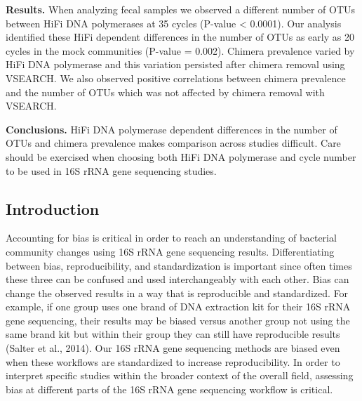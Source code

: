 \documentclass[12pt,]{article}
\begin{document}
\textbf{Results.} When analyzing fecal samples we observed a different
number of OTUs between HiFi DNA polymerases at 35 cycles (P-value
\textless{} 0.0001). Our analysis identified these HiFi dependent
differences in the number of OTUs as early as 20 cycles in the mock
communities (P-value = 0.002). Chimera prevalence varied by HiFi DNA
polymerase and this variation persisted after chimera removal using
VSEARCH. We also observed positive correlations between chimera
prevalence and the number of OTUs which was not affected by chimera
removal with VSEARCH.

\textbf{Conclusions.} HiFi DNA polymerase dependent differences in the
number of OTUs and chimera prevalence makes comparison across studies
difficult. Care should be exercised when choosing both HiFi DNA
polymerase and cycle number to be used in 16S rRNA gene sequencing
studies.

\newpage

\subsection{Introduction}\label{introduction}

Accounting for bias is critical in order to reach an understanding of
bacterial community changes using 16S rRNA gene sequencing results.
Differentiating between bias, reproducibility, and standardization is
important since often times these three can be confused and used
interchangeably with each other. Bias can change the observed results in
a way that is reproducible and standardized. For example, if one group
uses one brand of DNA extraction kit for their 16S rRNA gene sequencing,
their results may be biased versus another group not using the same
brand kit but within their group they can still have reproducible
results (Salter et al., 2014). Our 16S rRNA gene sequencing methods are
biased even when these workflows are standardized to increase
reproducibility. In order to interpret specific studies within the
broader context of the overall field, assessing bias at different parts
of the 16S rRNA gene sequencing workflow is critical.
\end{document}
